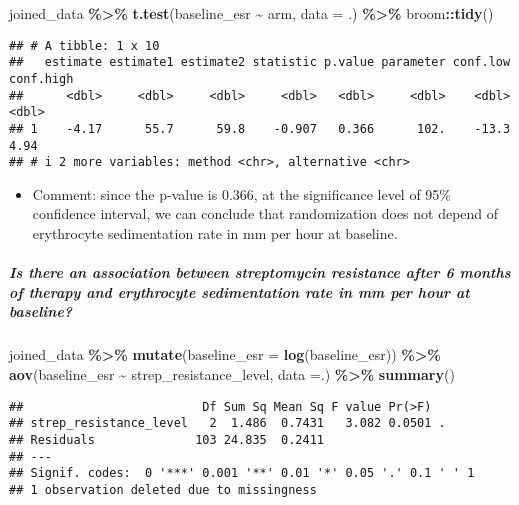 \documentclass[
]{article}
\newenvironment{Shaded}{\begin{snugshade}}{\end{snugshade}}
\newcommand{\AttributeTok}[1]{\textcolor[rgb]{0.13,0.29,0.53}{#1}}
\newcommand{\FunctionTok}[1]{\textcolor[rgb]{0.13,0.29,0.53}{\textbf{#1}}}
\newcommand{\NormalTok}[1]{#1}
\newcommand{\SpecialCharTok}[1]{\textcolor[rgb]{0.81,0.36,0.00}{\textbf{#1}}}
\providecommand{\tightlist}{%
  \setlength{\itemsep}{0pt}\setlength{\parskip}{0pt}}
\begin{document}
\begin{Shaded}
\begin{Highlighting}[]
\NormalTok{joined\_data }\SpecialCharTok{\%\textgreater{}\%}
  \FunctionTok{t.test}\NormalTok{(baseline\_esr }\SpecialCharTok{\textasciitilde{}}\NormalTok{ arm, }\AttributeTok{data =}\NormalTok{ .) }\SpecialCharTok{\%\textgreater{}\%} 
\NormalTok{  broom}\SpecialCharTok{::}\FunctionTok{tidy}\NormalTok{()}
\end{Highlighting}
\end{Shaded}

\begin{verbatim}
## # A tibble: 1 x 10
##   estimate estimate1 estimate2 statistic p.value parameter conf.low conf.high
##      <dbl>     <dbl>     <dbl>     <dbl>   <dbl>     <dbl>    <dbl>     <dbl>
## 1    -4.17      55.7      59.8    -0.907   0.366      102.    -13.3      4.94
## # i 2 more variables: method <chr>, alternative <chr>
\end{verbatim}

\begin{itemize}
\tightlist
\item
  Comment: since the p-value is 0.366, at the significance level of 95\%
  confidence interval, we can conclude that randomization does not
  depend of erythrocyte sedimentation rate in mm per hour at baseline.
\end{itemize}

\subparagraph{Is there an association between streptomycin resistance
after 6 months of therapy and erythrocyte sedimentation rate in mm per
hour at
baseline?}\label{is-there-an-association-between-streptomycin-resistance-after-6-months-of-therapy-and-erythrocyte-sedimentation-rate-in-mm-per-hour-at-baseline}

\begin{Shaded}
\begin{Highlighting}[]
\NormalTok{joined\_data }\SpecialCharTok{\%\textgreater{}\%}
  \FunctionTok{mutate}\NormalTok{(}\AttributeTok{baseline\_esr =} \FunctionTok{log}\NormalTok{(baseline\_esr)) }\SpecialCharTok{\%\textgreater{}\%}
  \FunctionTok{aov}\NormalTok{(baseline\_esr }\SpecialCharTok{\textasciitilde{}}\NormalTok{ strep\_resistance\_level, }\AttributeTok{data =}\NormalTok{.) }\SpecialCharTok{\%\textgreater{}\%}
  \FunctionTok{summary}\NormalTok{()}
\end{Highlighting}
\end{Shaded}

\begin{verbatim}
##                         Df Sum Sq Mean Sq F value Pr(>F)  
## strep_resistance_level   2  1.486  0.7431   3.082 0.0501 .
## Residuals              103 24.835  0.2411                 
## ---
## Signif. codes:  0 '***' 0.001 '**' 0.01 '*' 0.05 '.' 0.1 ' ' 1
## 1 observation deleted due to missingness
\end{verbatim}
\end{document}
